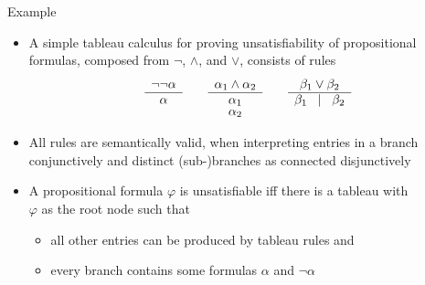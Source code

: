 \begin{frame}{Example}
  \begin{itemize}
  \item<1-> A simple tableau calculus for proving unsatisfiability of propositional
    formulas, composed from $\neg$, $\wedge$, and $\vee$, consists of rules
    \[
    \begin{array}[t]{c}
      \neg\neg \alpha\\
      \hline
      \alpha
    \end{array}
    \qquad
    \begin{array}[t]{c}
      \alpha_1 \wedge \alpha_2 \\
      \hline
      \alpha_1\\[-1mm]
      \alpha_2
    \end{array}
    \qquad
    \begin{array}[t]{c}
      \beta_1 \vee \beta_2 \\
      \hline
      \beta_1 \;\; \mid \;\; \beta_2
    \end{array}
    \]
  \item<2-> All rules are semantically valid, when interpreting entries in a branch conjunctively and distinct (sub-)branches as connected disjunctively
  \item<3->
    A propositional formula $\varphi$ %
    is unsatisfiable iff
    there is a tableau with\\ $\varphi$ as the root node such that
    \begin{itemize}\normalsize
    \item all other entries can be produced by tableau rules and
    \item every branch contains some formulas $\alpha$ and $\neg\alpha$
    \end{itemize}
  \end{itemize}
\end{frame}
